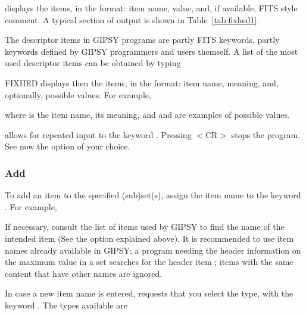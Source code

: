  displays the items, in the format: item name, value,
and, if available, FITS style comment.  A typical section of
 output is shown in Table~\ref{tab:fixhed1}.


The descriptor items in GIPSY programs are partly FITS keywords, partly
keywords defined by GIPSY programmers and users themself.  A list of
the most used descriptor items can be obtained by typing


FIXHED displays then the items, in the format: item name, meaning, and,
optionally, possible values.  For example,


where  is the item name,  its
meaning, and  and  are examples of
possible values. 

 allows for repeated input to the keyword
.  Pressing $<$CR$>$ stops the program.  See now the
option of your choice. 

\subsubsection{Add}

To add an item to the specified (sub)set(s), assign the item name to the
keyword .  For example,


If necessary, consult the list of items used by GIPSY to find the name of
the intended item (See the option  
explained above).  It is recommended to use item names already available
in GIPSY; a program needing the header information on the maximum value
in a set searches for the header item ; items with
the same content that have other names are ignored. 

In case a new item name is entered,  requests that you 
select the type, with the keyword .  The types available are

